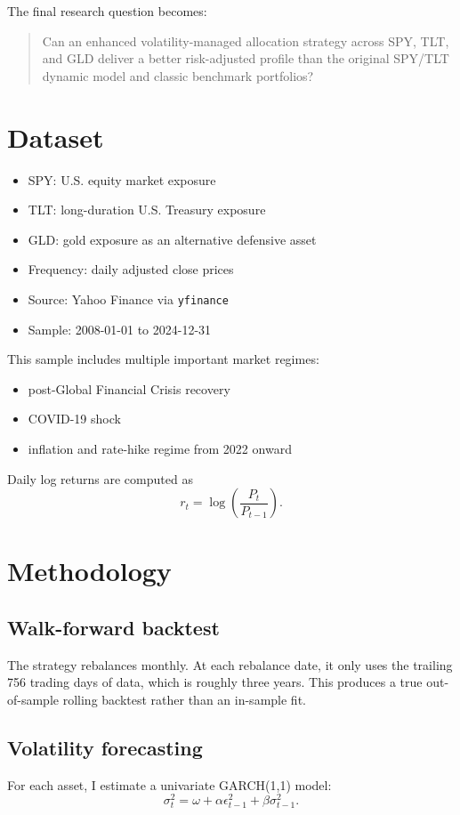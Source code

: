 \documentclass[11pt]{article}
\begin{document}
The final research question becomes:

\begin{quote}
Can an enhanced volatility-managed allocation strategy across SPY, TLT, and GLD deliver a better risk-adjusted profile than the original SPY/TLT dynamic model and classic benchmark portfolios?
\end{quote}

\section{Dataset}
\begin{itemize}
    \item SPY: U.S. equity market exposure
    \item TLT: long-duration U.S. Treasury exposure
    \item GLD: gold exposure as an alternative defensive asset
    \item Frequency: daily adjusted close prices
    \item Source: Yahoo Finance via \texttt{yfinance}
    \item Sample: 2008-01-01 to 2024-12-31
\end{itemize}

This sample includes multiple important market regimes:
\begin{itemize}
    \item post-Global Financial Crisis recovery
    \item COVID-19 shock
    \item inflation and rate-hike regime from 2022 onward
\end{itemize}

Daily log returns are computed as
\[
r_t = \log\left(\frac{P_t}{P_{t-1}}\right).
\]

\section{Methodology}
\subsection{Walk-forward backtest}
The strategy rebalances monthly. At each rebalance date, it only uses the trailing 756 trading days of data, which is roughly three years. This produces a true out-of-sample rolling backtest rather than an in-sample fit.

\subsection{Volatility forecasting}
For each asset, I estimate a univariate GARCH(1,1) model:
\[
\sigma_t^2 = \omega + \alpha \epsilon_{t-1}^2 + \beta \sigma_{t-1}^2.
\]
\end{document}
